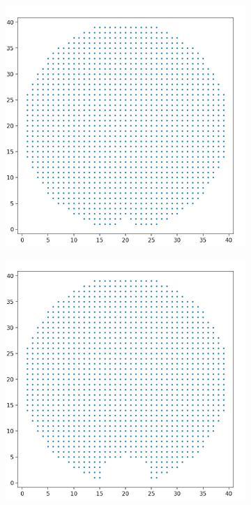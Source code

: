 \documentclass[10pt]{article}
\begin{document}
\begin{figure}[H]
    \centering
    \begin{subfigure}[h]{0.2\textwidth}
        \includegraphics[width=\linewidth]{mh_1}
    \end{subfigure}
    \begin{subfigure}[h]{0.2\textwidth}
        \includegraphics[width=\linewidth]{mh_2}

\end{subfigure}
\end{figure}
\end{document}
